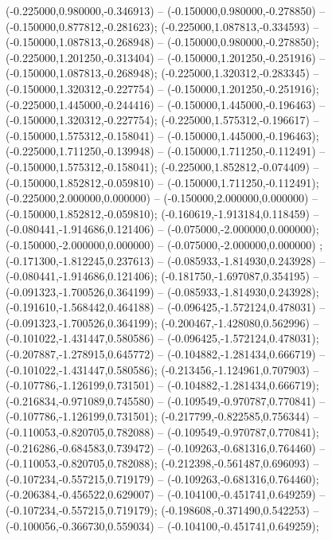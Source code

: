  (-0.225000,0.980000,-0.346913) -- (-0.150000,0.980000,-0.278850) -- (-0.150000,0.877812,-0.281623);
 (-0.225000,1.087813,-0.334593) -- (-0.150000,1.087813,-0.268948) -- (-0.150000,0.980000,-0.278850);
 (-0.225000,1.201250,-0.313404) -- (-0.150000,1.201250,-0.251916) -- (-0.150000,1.087813,-0.268948);
 (-0.225000,1.320312,-0.283345) -- (-0.150000,1.320312,-0.227754) -- (-0.150000,1.201250,-0.251916);
 (-0.225000,1.445000,-0.244416) -- (-0.150000,1.445000,-0.196463) -- (-0.150000,1.320312,-0.227754);
 (-0.225000,1.575312,-0.196617) -- (-0.150000,1.575312,-0.158041) -- (-0.150000,1.445000,-0.196463);
 (-0.225000,1.711250,-0.139948) -- (-0.150000,1.711250,-0.112491) -- (-0.150000,1.575312,-0.158041);
 (-0.225000,1.852812,-0.074409) -- (-0.150000,1.852812,-0.059810) -- (-0.150000,1.711250,-0.112491);
 (-0.225000,2.000000,0.000000) -- (-0.150000,2.000000,0.000000) -- (-0.150000,1.852812,-0.059810);
 (-0.160619,-1.913184,0.118459) -- (-0.080441,-1.914686,0.121406) -- (-0.075000,-2.000000,0.000000);
 (-0.150000,-2.000000,0.000000) -- (-0.075000,-2.000000,0.000000) ;
 (-0.171300,-1.812245,0.237613) -- (-0.085933,-1.814930,0.243928) -- (-0.080441,-1.914686,0.121406);
 (-0.181750,-1.697087,0.354195) -- (-0.091323,-1.700526,0.364199) -- (-0.085933,-1.814930,0.243928);
 (-0.191610,-1.568442,0.464188) -- (-0.096425,-1.572124,0.478031) -- (-0.091323,-1.700526,0.364199);
 (-0.200467,-1.428080,0.562996) -- (-0.101022,-1.431447,0.580586) -- (-0.096425,-1.572124,0.478031);
 (-0.207887,-1.278915,0.645772) -- (-0.104882,-1.281434,0.666719) -- (-0.101022,-1.431447,0.580586);
 (-0.213456,-1.124961,0.707903) -- (-0.107786,-1.126199,0.731501) -- (-0.104882,-1.281434,0.666719);
 (-0.216834,-0.971089,0.745580) -- (-0.109549,-0.970787,0.770841) -- (-0.107786,-1.126199,0.731501);
 (-0.217799,-0.822585,0.756344) -- (-0.110053,-0.820705,0.782088) -- (-0.109549,-0.970787,0.770841);
 (-0.216286,-0.684583,0.739472) -- (-0.109263,-0.681316,0.764460) -- (-0.110053,-0.820705,0.782088);
 (-0.212398,-0.561487,0.696093) -- (-0.107234,-0.557215,0.719179) -- (-0.109263,-0.681316,0.764460);
 (-0.206384,-0.456522,0.629007) -- (-0.104100,-0.451741,0.649259) -- (-0.107234,-0.557215,0.719179);
 (-0.198608,-0.371490,0.542253) -- (-0.100056,-0.366730,0.559034) -- (-0.104100,-0.451741,0.649259);
